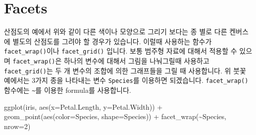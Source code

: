 \documentclass[
]{book}
\newenvironment{Shaded}{\begin{snugshade}}{\end{snugshade}}
\newcommand{\AttributeTok}[1]{\textcolor[rgb]{0.77,0.63,0.00}{#1}}
\newcommand{\DecValTok}[1]{\textcolor[rgb]{0.00,0.00,0.81}{#1}}
\newcommand{\FunctionTok}[1]{\textcolor[rgb]{0.00,0.00,0.00}{#1}}
\newcommand{\NormalTok}[1]{#1}
\newcommand{\OtherTok}[1]{\textcolor[rgb]{0.56,0.35,0.01}{#1}}
\newcommand{\SpecialCharTok}[1]{\textcolor[rgb]{0.00,0.00,0.00}{#1}}
\newcommand{\StringTok}[1]{\textcolor[rgb]{0.31,0.60,0.02}{#1}}
\begin{document}
\begin{Shaded}
\end{Shaded}

\hypertarget{facets}{%
\section{Facets}\label{facets}}

산점도의 예에서 위와 같이 다른 색이나 모양으로 그리기 보다는 종 별로 다른 켄버스에 별도의 산점도를 그려야 할 경우가 있습니다. 이럴때 사용하는 함수가 \texttt{facet\_wrap()}이나 \texttt{facet\_grid()} 입니다. 보통 범주형 자료에 대해서 적용할 수 있으며 \texttt{facet\_wrap()}은 하나의 변수에 대해서 그림을 나눠그릴때 사용하고 \texttt{facet\_grid()}는 두 개 변수의 조합에 의한 그래프들을 그릴 때 사용합니다. 위 붓꽃 예에서는 3가지 종을 나타내는 변수 \texttt{Species}를 이용하면 되겠습니다. \texttt{facet\_wrap()}함수에는 \texttt{\textasciitilde{}}를 이용한 formula를 사용합니다.

\begin{Shaded}
\begin{Highlighting}[]

\FunctionTok{ggplot}\NormalTok{(iris, }\FunctionTok{aes}\NormalTok{(}\AttributeTok{x=}\NormalTok{Petal.Length, }\AttributeTok{y=}\NormalTok{Petal.Width)) }\SpecialCharTok{+} 
  \FunctionTok{geom\_point}\NormalTok{(}\FunctionTok{aes}\NormalTok{(}\AttributeTok{color=}\NormalTok{Species, }\AttributeTok{shape=}\NormalTok{Species)) }\SpecialCharTok{+}
  \FunctionTok{facet\_wrap}\NormalTok{(}\SpecialCharTok{\textasciitilde{}}\NormalTok{Species, }\AttributeTok{nrow=}\DecValTok{2}\NormalTok{)}
\end{Highlighting}
\end{Shaded}
\end{document}
